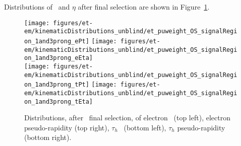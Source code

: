 Distributions of \pt ~and $\eta$ after final selection are shown in Figure~\ref{fig:etau_sr_pt_eta}.
\begin{figure}[thbp!]\centering
  \texttt{[image: figures/et-em/kinematicDistributions\_unblind/et\_puweight\_OS\_signalRegion\_1and3prong\_ePt]}
  \texttt{[image: figures/et-em/kinematicDistributions\_unblind/et\_puweight\_OS\_signalRegion\_1and3prong\_eEta]} \\
  \texttt{[image: figures/et-em/kinematicDistributions\_unblind/et\_puweight\_OS\_signalRegion\_1and3prong\_tPt]}
  \texttt{[image: figures/et-em/kinematicDistributions\_unblind/et\_puweight\_OS\_signalRegion\_1and3prong\_tEta]}
  \caption{\label{fig:etau_sr_pt_eta} Distributions, after \teth ~final
    selection, of electron \pt ~(top left), electron pseudo-rapidity
    (top right), $\tau_h$ \pt ~(bottom left), $\tau_h$ pseudo-rapidity
    (bottom right).}
\end{figure}




